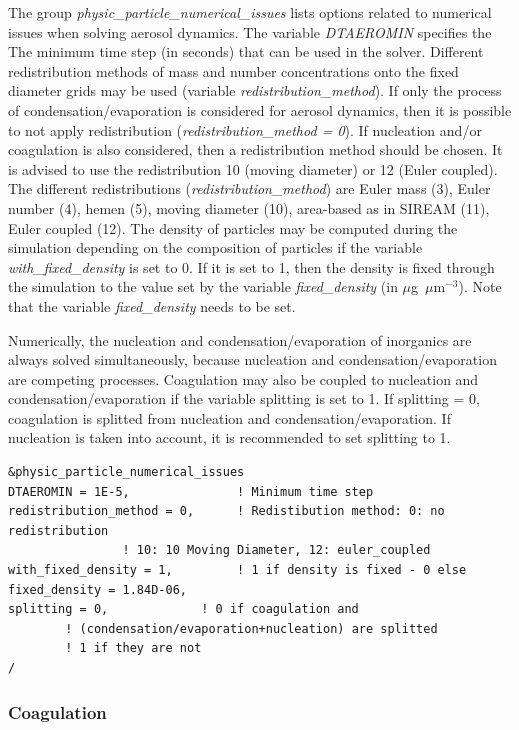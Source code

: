 \documentclass[a4paper,11pt]{article}
\begin{document}
The group {\textit{physic\_particle\_numerical\_issues}} lists options related to numerical issues when solving aerosol dynamics. 
The variable {\textit{DTAEROMIN}} specifies the The minimum time step (in seconds) that can be used in the solver. 
Different redistribution methods of mass and number concentrations onto the fixed diameter grids may be used (variable {\textit{redistribution\_method}}). If only the process of condensation/evaporation is considered for aerosol dynamics, then it is possible to not apply redistribution ({\textit{redistribution\_method = 0}}). If nucleation and/or coagulation is also considered, then a redistribution method should be chosen. It is advised to use the redistribution 10 (moving diameter) or 12 (Euler coupled). The different redistributions ({\textit{redistribution\_method}}) are Euler mass (3), Euler number (4), hemen (5), moving diameter (10), area-based as in SIREAM (11), Euler coupled (12).
The density of particles may be computed during the simulation depending on the composition of particles if the variable {\textit{with\_fixed\_density}} is set to 0. If it is set to 1, then the density is fixed through the simulation to the value set by the variable {\textit{fixed\_density}} (in $\mu$g~$\mu$m$^{-3}$). Note that the variable {\textit{fixed\_density}} needs to be set.

Numerically, the nucleation and condensation/evaporation of inorganics are always solved simultaneously, because nucleation and condensation/evaporation are competing processes. Coagulation may also be coupled to nucleation and condensation/evaporation if the variable splitting is set to 1. If splitting = 0, coagulation is splitted from nucleation and condensation/evaporation. If nucleation is taken into account, it is recommended to set splitting to 1.

\begin{verbatim}
&physic_particle_numerical_issues
DTAEROMIN = 1E-5,              	! Minimum time step
redistribution_method = 0,   	! Redistibution method: 0: no redistribution
				! 10: 10 Moving Diameter, 12: euler_coupled
with_fixed_density = 1,       	! 1 if density is fixed - 0 else
fixed_density = 1.84D-06,        
splitting = 0,             ! 0 if coagulation and 
		! (condensation/evaporation+nucleation) are splitted 
		! 1 if they are not
/
\end{verbatim}

\subsubsection{Coagulation}
\end{document}
